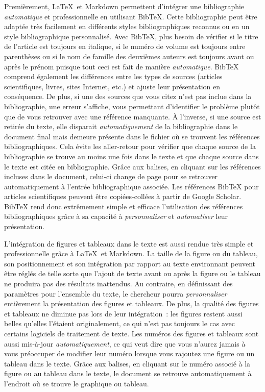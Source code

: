 \documentclass[
  letterpaper,
]{scrbook}
\begin{document}
Premièrement, \LaTeX~et Markdown permettent d'intégrer une bibliographie
\emph{automatique} et professionnelle en utilisant BibTeX. Cette
bibliographie peut être adaptée très facilement en différents styles
bibliographiques reconnus ou en un style bibliographique personnalisé.
Avec BibTeX, plus besoin de vérifier si le titre de l'article est
toujours en italique, si le numéro de volume est toujours entre
parenthèses ou si le nom de famille des deuxièmes auteurs est toujours
avant ou après le prénom puisque tout ceci est fait de manière
\emph{automatique}. BibTeX comprend également les différences entre les
types de sources (articles scientifiques, livres, sites Internet, etc.)
et ajuste leur présentation en conséquence. De plus, si une des sources
que vous citez n'est pas inclue dans la bibliographie, une erreur
s'affiche, vous permettant d'identifier le problème plutôt que de vous
retrouver avec une référence manquante. À l'inverse, si une source est
retirée du texte, elle disparait \emph{automatiquement} de la
bibliographie dans le document final mais demeure présente dans le
fichier où se trouvent les références bibliographiques. Cela évite les
aller-retour pour vérifier que chaque source de la bibliographie se
trouve au moins une fois dans le texte et que chaque source dans le
texte est citée en bibliographie. Grâce aux balises, en cliquant sur les
références incluses dans le document, celui-ci change de page pour se
retrouver automatiquement à l'entrée bibliographique associée. Les
références BibTeX pour articles scientifiques peuvent être
copiées-collées à partir de Google Scholar. BibTeX rend donc extrêmement
simple et efficace l'utilisation des références bibliographiques grâce à
sa capacité à \emph{personnaliser} et \emph{automatiser} leur
présentation.

L'intégration de figures et tableaux dans le texte est aussi rendue très
simple et professionnelle grâce à \LaTeX~et Markdown. La taille de la
figure ou du tableau, son positionnement et son intégration par rapport
au texte environnant peuvent être réglés de telle sorte que l'ajout de
texte avant ou après la figure ou le tableau ne produira pas des
résultats inattendus. Au contraire, en définissant des paramètres pour
l'ensemble du texte, le chercheur pourra \emph{personnaliser}
entièrement la présentation des figures et tableaux. De plus, la qualité
des figures et tableaux ne diminue pas lors de leur intégration~: les
figures restent aussi belles qu'elles l'étaient originalement, ce qui
n'est pas toujours le cas avec certains logiciels de traitement de
texte. Les numéros des figures et tableaux sont aussi mis-à-jour
\emph{automatiquement}, ce qui veut dire que vous n'aurez jamais à vous
préoccuper de modifier leur numéro lorsque vous rajoutez une figure ou
un tableau dans le texte. Grâce aux balises, en cliquant sur le numéro
associé à la figure ou au tableau dans le texte, le document se retrouve
automatiquement à l'endroit où se trouve le graphique ou tableau.
\end{document}

